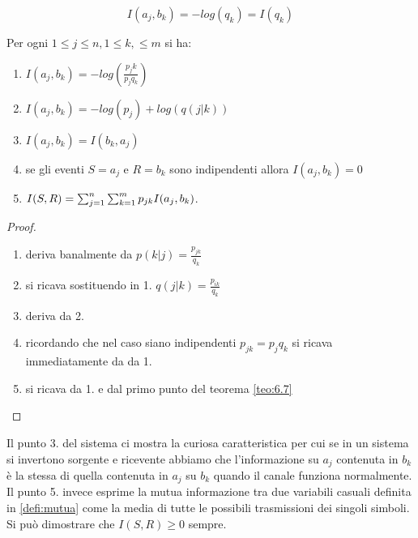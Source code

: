 $$I(a_j,b_k)=-log(q_k)=I(q_k)$$
\begin{teo}
Per ogni $1\leq j \leq n , 1 \leq k, \leq m$ si ha:
\begin{enumerate}
\item $I(a_j,b_k)=-log(\frac{p_jk}{p_j q_k})$
\item $I(a_j,b_k)=-log(p_j)+log(q(j|k))$
\item $I(a_j,b_k)=I(b_k,a_j)$
\item se gli eventi $S=a_j$ e $R=b_k$ sono indipendenti allora $I(a_j,b_k)=0$
\item $I(S,R)=\sum_{j=1}^n \sum_{k=1}^m p_{jk}I(a_j,b_k)$.
\end{enumerate}
\end{teo}
\begin{proof}
\begin{enumerate}
\item deriva banalmente da $p(k|j)=\frac{p_{jk}}{q_k}$
\item si ricava sostituendo in 1. $q(j|k)=\frac{p_{ik}}{q_k}$
\item deriva da 2.
\item ricordando che nel caso siano indipendenti $p_{jk}=p_jq_k$ si ricava immediatamente da da 1.
\item si ricava da 1. e dal primo punto del teorema \ref{teo:6.7}
\end{enumerate}
\end{proof}

Il punto 3. del sistema ci mostra la curiosa caratteristica per cui se in un sistema si invertono sorgente e ricevente abbiamo che l'informazione su $a_j$ contenuta in $b_k$ è la stessa di quella contenuta in $a_j$ su $b_k$ quando il canale funziona normalmente. Il punto 5. invece esprime la mutua informazione tra due variabili casuali definita in \ref{defi:mutua} come la media di tutte le possibili trasmissioni dei singoli simboli. Si può dimostrare che $I(S,R)\geq 0$ sempre.\\

